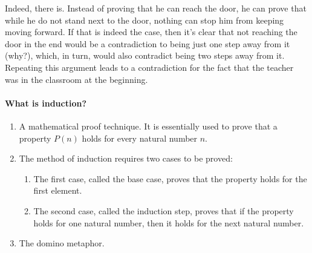 Indeed, there is. Instead of proving that he can reach the door, he can prove that while he do not stand next to the door, nothing can stop him from keeping moving forward. If that is indeed the case, then it's clear that not reaching the door in the end would be a contradiction to being just one step away from it (why?), which, in turn, would also contradict being two steps away from it. Repeating this argument leads to a contradiction for the fact that the teacher was in the classroom at the beginning.

\paragraph{What is induction?}
\begin{enumerate}
    \item A mathematical proof technique. It is essentially used to prove that a property \(P(n)\) holds for every natural number \(n\).
    \item The method of induction requires two cases to be proved:
    \begin{enumerate}
        \item The first case, called the base case, proves that the property holds for the first element.
        \item The second case, called the induction step, proves that if the property holds for one natural number, then it holds for the next natural number.
    \end{enumerate}
    \item The domino metaphor. 
\end{enumerate}
